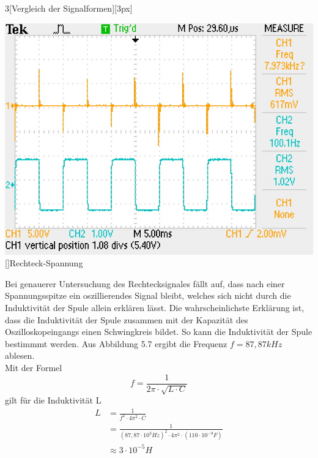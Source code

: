 \begin{multicols}{3}[Vergleich der Signalformen][3px]
\begin{center}
  \includegraphics[scale=0.5]{Daten/Rechteck.JPG}
  []{Rechteck-Spannung}
\end{center}
\end{multicols}

Bei genauerer Untersuchung des Rechtecksignales fällt auf, dass nach einer Spannungsspitze ein oszillierendes Signal bleibt, welches sich nicht durch die Induktivität der Spule allein erklären lässt. Die wahrscheinlichste Erklärung ist, dass die Induktivität der Spule zusammen mit der Kapazität des Oszilloskopeingangs einen Schwingkreis bildet. So kann die Induktivität der Spule bestimmmt werden. Aus Abbildung 5.7 ergibt die Frequenz $f=87,87 kHz$ ablesen.\\
Mit der Formel
\begin{equation}
	f  = \frac{1}{2\pi\cdot\sqrt{ L\cdot C}}
\end{equation}
gilt für die Induktivität L
\begin{align*}
	  L &= \frac{1}{f^2 \cdot 4\pi^2 \cdot C} \\
      &= \frac{1}{(87,87 \cdot 10^{3} Hz)^2 \cdot 4\pi^2 \cdot (110 \cdot 10^{-9} F)} \\
      &  \approx 3 \cdot 10^{-5} H
\end{align*}

